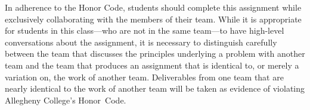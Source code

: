 
In adherence to the Honor Code, students should complete this assignment while exclusively collaborating with the
members of their team. While it is appropriate for students in this class---who are not in the same team---to have
high-level conversations about the assignment, it is necessary to distinguish carefully between the team that discusses
the principles underlying a problem with another team and the team that produces an assignment that is identical to, or
merely a variation on, the work of another team.  Deliverables from one team that are nearly identical to the work of
another team will be taken as evidence of violating Allegheny College's \mbox{Honor Code}.






